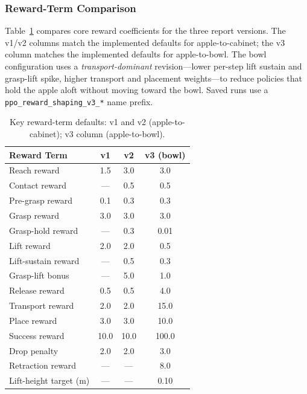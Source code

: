 \documentclass[11pt,a4paper]{article}
\begin{document}
\subsubsection{Reward-Term Comparison}
Table~\ref{tab:reward-compare} compares core reward coefficients for the three report versions. The v1/v2 columns match the implemented defaults for apple-to-cabinet; the v3 column matches the implemented defaults for apple-to-bowl. The bowl configuration uses a \emph{transport-dominant} revision---lower per-step lift sustain and grasp-lift spike, higher transport and placement weights---to reduce policies that hold the apple aloft without moving toward the bowl. Saved runs use a \texttt{ppo\_reward\_shaping\_v3\_*} name prefix.

\begin{table}[h]
\centering
\caption{Key reward-term defaults: v1 and v2 (apple-to-cabinet); v3 column (apple-to-bowl).}
\label{tab:reward-compare}
\begin{tabular}{@{}lccc@{}}
\toprule
Reward Term & v1 & v2 & v3 (bowl) \\
\midrule
Reach reward & 1.5 & 3.0 & 3.0 \\
Contact reward & --- & 0.5 & 0.5 \\
Pre-grasp reward & 0.1 & 0.3 & 0.3 \\
Grasp reward & 3.0 & 3.0 & 3.0 \\
Grasp-hold reward & --- & 0.3 & 0.01 \\
Lift reward & 2.0 & 2.0 & 0.5 \\
Lift-sustain reward & --- & 0.5 & 0.3 \\
Grasp-lift bonus & --- & 5.0 & 1.0 \\
Release reward & 0.5 & 0.5 & 4.0 \\
Transport reward & 2.0 & 2.0 & 15.0 \\
Place reward & 3.0 & 3.0 & 10.0 \\
Success reward & 10.0 & 10.0 & 100.0 \\
Drop penalty & 2.0 & 2.0 & 3.0 \\
Retraction reward & --- & --- & 8.0 \\
Lift-height target (m) & --- & --- & 0.10 \\
\bottomrule
\end{tabular}
\end{table}
\end{document}
